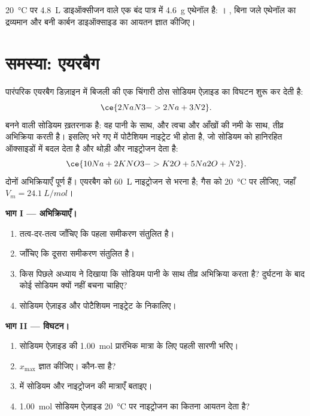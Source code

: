 \begin{exercise}[$\star\star\star$]\label{exo:g10:reaction-progress-table:15}
\qty{20}{\celsius} पर \qty{4.8}{L} डाइऑक्सीजन वाले एक बंद पात्र में \qty{4.6}{g}
एथेनॉल   है:
। , बिना जले एथेनॉल का
द्रव्यमान और बनी कार्बन डाइऑक्साइड का आयतन ज्ञात कीजिए।
\end{exercise}

\section{समस्या: एयरबैग}

\begin{problem}
\label{pb:g10:reaction-progress-table:1}
पारंपरिक एयरबैग डिज़ाइन में बिजली की एक चिंगारी ठोस सोडियम ऐज़ाइड का
विघटन शुरू कर देती है:
\[
  \ce{2NaN3 -> 2Na + 3N2} .
\]
बनने वाली सोडियम  ख़तरनाक है: वह पानी के साथ, और त्वचा और आँखों की नमी के
साथ, तीव्र अभिक्रिया करती है। इसलिए भरे गए  में पोटैशियम नाइट्रेट भी होता है, जो
सोडियम को हानिरहित ऑक्साइडों में बदल देता है और थोड़ी और नाइट्रोजन
देता है:
\[
  \ce{10Na + 2KNO3 -> K2O + 5Na2O + N2} .
\]
दोनों अभिक्रियाएँ पूर्ण हैं। एयरबैग को \qty{60}{L}
नाइट्रोजन से भरना है; गैस को \qty{20}{\celsius} पर लीजिए, जहाँ
$V_m = \qty{24.1}{L/mol}$।

\medskip
\noindent\textbf{भाग I --- अभिक्रियाएँ।}
\begin{enumerate}
  \item तत्व-दर-तत्व जाँचिए कि पहला समीकरण संतुलित है।
  \item जाँचिए कि दूसरा समीकरण संतुलित है।
  \item किस पिछले अध्याय ने दिखाया कि सोडियम पानी के साथ तीव्र अभिक्रिया करता
        है? दुर्घटना के बाद कोई सोडियम क्यों नहीं बचना चाहिए?
  \item सोडियम ऐज़ाइड  और
        पोटैशियम नाइट्रेट  के  निकालिए।
\end{enumerate}

\medskip
\noindent\textbf{भाग II --- विघटन।}
\begin{enumerate}[resume]
  \item सोडियम ऐज़ाइड की \qty{1.00}{mol} प्रारंभिक मात्रा के लिए पहली
         सारणी भरिए।
  \item $x_{\max}$ ज्ञात कीजिए।  कौन-सा है?
  \item {} में सोडियम और नाइट्रोजन की मात्राएँ बताइए।
  \item \qty{1.00}{mol} सोडियम ऐज़ाइड \qty{20}{\celsius} पर नाइट्रोजन का कितना
        आयतन देता है?
\end{enumerate}


\end{problem}
